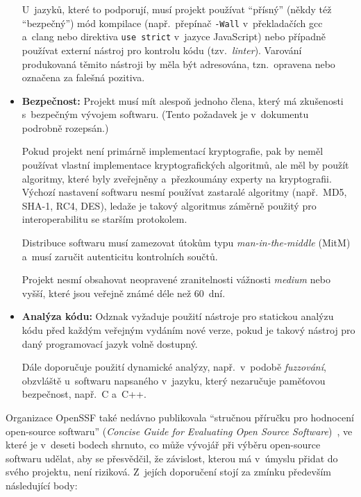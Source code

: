 \begin{itemize}
        U~jazyků, které to podporují, musí projekt používat ``přísný'' (někdy též ``bezpečný'') mód kompilace (např.\ přepínač \texttt{-Wall} v~překladačích gcc a~clang nebo direktiva \texttt{use strict} v~jazyce JavaScript) nebo případně používat externí nástroj pro kontrolu kódu (tzv.\ \emph{linter}). Varování produkovaná těmito nástroji by měla být adresována, tzn.\ opravena nebo označena za falešná pozitiva.
    
    \item \textbf{Bezpečnost:} \enskip
        Projekt musí mít alespoň jednoho člena, který má zkušenosti s~bezpečným vývojem softwaru. (Tento požadavek je v~dokumentu~\cite{ciibadge} podrobně rozepsán.)
        
        Pokud projekt není primárně implementací kryptografie, pak by neměl používat vlastní implementace kryptografických algoritmů, ale měl by použít algoritmy, které byly zveřejněny a~přezkoumány experty na kryptografii. Výchozí nastavení softwaru nesmí používat zastaralé algoritmy (např.\ MD5, SHA-1, RC4, DES), ledaže je takový algoritmus záměrně použitý pro interoperabilitu se starším protokolem.

        Distribuce softwaru musí zamezovat útokům typu \textit{man-in-the-middle} (MitM) a~musí zaručit autenticitu kontrolních součtů.

        Projekt nesmí obsahovat neopravené zranitelnosti vážnosti \emph{medium} nebo vyšší, které jsou veřejně známé déle než 60~dní.

    \item \textbf{Analýza kódu:} \enskip
        Odznak vyžaduje použití nástroje pro statickou analýzu kódu před každým veřejným vydáním nové verze, pokud je takový nástroj pro daný programovací jazyk volně dostupný.

        Dále doporučuje použití dynamické analýzy, např.\ v~podobě \emph{fuzzování}, obzvláště u~softwaru napsaného v~jazyku, který nezaručuje paměťovou bezpečnost, např.\ C a~C++.
\end{itemize}

Organizace OpenSSF také nedávno publikovala ``stručnou příručku pro hodnocení open-source softwaru'' (\emph{Concise Guide for Evaluating Open Source Software})~\cite{concise-guide-eval}, ve které je v~deseti bodech shrnuto, co může vývojář při výběru open-source softwaru udělat, aby se přesvědčil, že závislost, kterou má v~úmyslu přidat do svého projektu, není riziková. Z~jejích doporučení stojí za zmínku především následující body:

